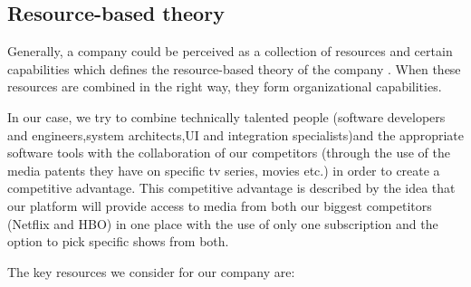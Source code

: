 \subsection{Resource-based theory}

Generally, a company could be perceived as a collection of resources and certain capabilities which defines the resource-based theory of the company \cite[p. 13-14]{fiveForces}.
When these resources are combined in the right way, they form organizational capabilities.

In our case, we try to combine technically talented people (software developers and engineers,system architects,UI and integration specialists)and the appropriate software tools with the collaboration of our competitors (through the use of the media patents they have on specific tv series, movies etc.) in order to create a competitive advantage. This competitive advantage is described by the idea that our platform will provide access to media from both our biggest competitors (Netflix and HBO) in one place with the use of only one subscription and the option to pick specific shows from both.

The key resources we consider for our company are:

